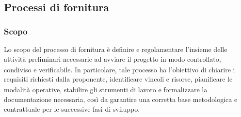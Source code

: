 \documentclass[a4paper,11pt]{article}
\newcommand{\G}{\textsubscript{\scalebox{0.6}{\textbf{G}}}}
\begin{document}
\subsection{Processi di fornitura}
\subsubsection{Scopo}
Lo scopo del processo di fornitura è definire e regolamentare l'insieme delle attività preliminari 
necessarie ad avviare il progetto\G{} in modo controllato, condiviso e verificabile. In particolare, 
tale processo ha l'obiettivo di chiarire i requisiti\G{} richiesti dalla proponente\G{}, identificare vincoli e risorse, 
pianificare le modalità operative, stabilire gli strumenti di lavoro e formalizzare la documentazione necessaria, 
così da garantire una corretta base metodologica e contrattuale per le successive fasi di sviluppo.
\end{document}
